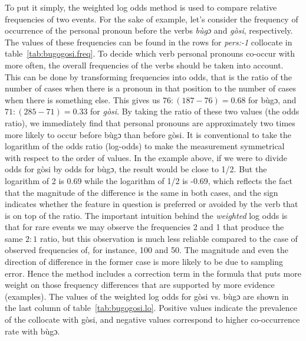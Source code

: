 \documentclass[12pt]{article}
\begin{document}
To put it simply, the weighted log odds method is used to compare
relative frequencies of two events. For the sake of example, let's
consider the frequency of occurrence of the personal pronoun before
the verbs \textit{bùgɔ} and \textit{gòsi}, respectively. The values of
these frequencies can be found in the rows for \textit{pers:-1}
collocate in table~\ref{tab:bugogosi.freq}. To decide which verb
personal pronouns co-occur with more often, the overall frequencies of
the verbs should be taken into account. This can be done by
transforming frequencies into odds, that is the ratio of the number of
cases when there is a pronoun in that position to the number of cases
when there is something else. This gives us $76:(187-76)=0.68$ for
bùgɔ, and $71:(285-71)=0.33$ for \textit{gòsi}. By taking the ratio of
these two values (the odds ratio), we immediately find that personal
pronouns are approximately two times more likely to occur before bùgɔ
than before gòsi. It is conventional to take the logarithm of the odds
ratio (log-odds) to make the measurement symmetrical with respect to
the order of values. In the example above, if we were to divide odds
for gòsi by odds for bùgɔ, the result would be close to 1/2. But the
logarithm of 2 is 0.69 while the logarithm of 1/2 is -0.69, which
reflects the fact that the magnitude of the difference is the same in
both cases, and the sign indicates whether the feature in question is
preferred or avoided by the verb that is on top of the ratio.  The
important intuition behind the \textit{weighted} log odds is that for
rare events we may observe the frequencies 2 and 1 that produce the
same $2:1$ ratio, but this observation is much less reliable compared
to the case of observed frequencies of, for instance, 100 and 50. The
magnitude and even the direction of difference in the former case is
more likely to be due to sampling error. Hence the method includes a
correction term in the formula that puts more weight on those
frequency differences that are supported by more evidence
(examples). The values of the weighted log odds for gòsi vs. bùgɔ are
shown in the last column of table~\ref{tab:bugogosi.lo}. Positive
values indicate the prevalence of the collocate with gòsi, and
negative values correspond to higher co-occurrence rate with bùgɔ.
\end{document}
